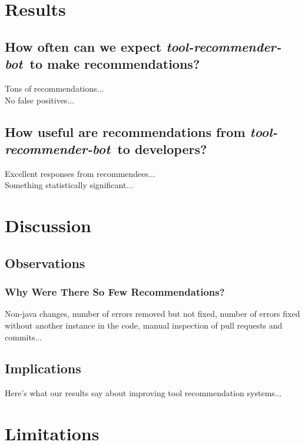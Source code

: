 \documentclass[sigconf,review,anonymous]{acmart}
\newcommand{\tool}{\textsl{tool-recommender-bot}}
\begin{document}
\section{Results}

\subsection{How often can we expect \tool~to make recommendations?}

Tons of recommendations... \\

No false positives...

\subsection{How useful are recommendations from \tool~to developers?}

Excellent responses from recommendees...\\

Something statistically significant...

\section{Discussion}

\subsection{Observations}

\subsubsection{Why Were There So Few Recommendations?}

Non-java changes, number of errors removed but not fixed, number of errors fixed without another instance in the code, manual inspection of pull requests and commits...

\subsection{Implications}

Here's what our results say about improving tool recommendation systems...

\section{Limitations}
\end{document}
